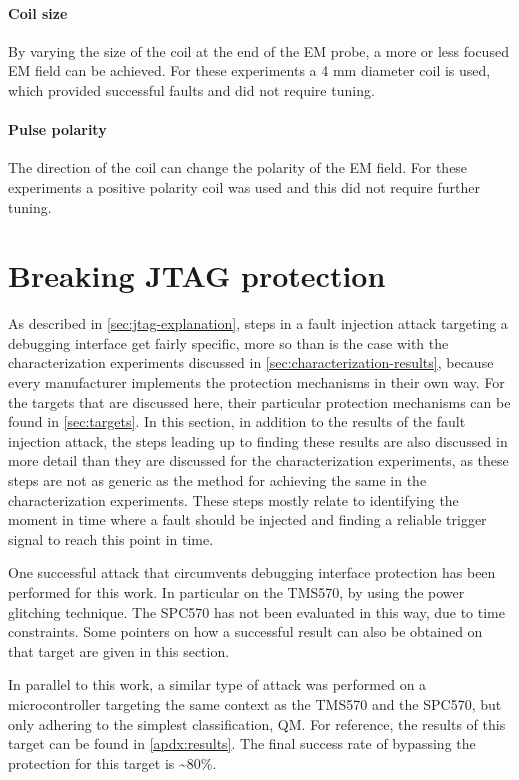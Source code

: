 \documentclass[10pt]{article}
\newcommand{\TI}{TMS570\xspace}
\newcommand{\ST}{SPC570\xspace}
\begin{document}
        \paragraph*{Coil size}
          By varying the size of the coil at the end of the EM probe, a more or less focused EM field can be achieved. For these experiments a 4 mm diameter coil is used, which provided successful faults and did not require tuning. 
        \paragraph*{Pulse polarity}
          The direction of the coil can change the polarity of the EM field. For these experiments a positive polarity coil was used and this did not require further tuning.

\newpage
\section{Breaking JTAG protection}
\label{sec:realistic-attack}

  As described in \autoref{sec:jtag-explanation}, steps in a fault injection attack targeting a debugging interface get fairly specific, more so than is the case with the characterization experiments discussed in \autoref{sec:characterization-results}, because every manufacturer implements the protection mechanisms in their own way. For the targets that are discussed here, their particular protection mechanisms can be found in \autoref{sec:targets}. In this section, in addition to the results of the fault injection attack, the steps leading up to finding these results are also discussed in more detail than they are discussed for the characterization experiments, as these steps are not as generic as the method for achieving the same in the characterization experiments. These steps mostly relate to identifying the moment in time where a fault should be injected and finding a reliable trigger signal to reach this point in time. 

  One successful attack that circumvents debugging interface protection has been performed for this work. In particular on the \TI, by using the power glitching technique. The \ST has not been evaluated in this way, due to time constraints. Some pointers on how a successful result can also be obtained on that target are given in this section.

  In parallel to this work, a similar type of attack was performed on a microcontroller targeting the same context as the \TI and the \ST, but only adhering to the simplest classification, QM. For reference, the results of this target can be found in \autoref{apdx:results}. The final success rate of bypassing the protection for this target is \textasciitilde80\%.
\end{document}
